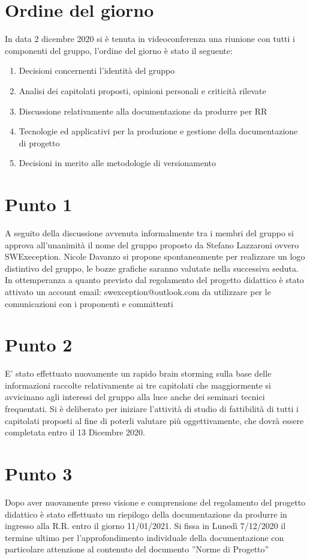 \documentclass[12pt,italian,a4paper]{article}
\begin{document}
	\newpage


	\section*{Ordine del giorno}
	In data 2 dicembre 2020 si è tenuta in videoconferenza una riunione con tutti i componenti del gruppo, l'ordine del giorno è stato il seguente:
	\begin{enumerate}
		\item Decisioni concernenti l'identità del gruppo
		\item Analisi dei capitolati proposti, opinioni personali e criticità rilevate
		\item Discussione relativamente alla documentazione da produrre per RR
		\item Tecnologie ed applicativi per la produzione e gestione della documentazione di progetto
		\item Decisioni in merito alle metodologie di versionamento
	\end{enumerate}

	\section*{Punto 1}
	A seguito della discussione avvenuta informalmente tra i membri del gruppo si approva all’unanimità il nome del gruppo proposto da Stefano Lazzaroni ovvero SWExeception. Nicole Davanzo si propone spontaneamente per realizzare un logo distintivo del gruppo, le bozze grafiche saranno valutate nella successiva seduta.
	In ottemperanza a quanto previsto dal regolamento del progetto didattico è stato attivato un account email: swexception@outlook.com da utilizzare per le comunicazioni con i proponenti e committenti

	\section*{Punto 2}
    E’ stato effettuato nuovamente un rapido brain storming sulla base delle informazioni raccolte relativamente ai tre capitolati che maggiormente si avvicinano agli interessi del gruppo alla luce anche dei seminari tecnici frequentati.
    Si è deliberato per iniziare l’attività di studio di fattibilità di tutti i capitolati proposti al fine di poterli valutare più oggettivamente, che dovrà essere completata entro il 13 Dicembre 2020.

	\section*{Punto 3}
	Dopo aver nuovamente preso visione e comprensione del regolamento del progetto didattico è stato effettuato un riepilogo della documentazione da produrre in ingresso alla R.R. entro il giorno 11/01/2021. Si fissa in Lunedì 7/12/2020 il termine ultimo per l’approfondimento individuale della documentazione con particolare attenzione al contenuto del documento ”Norme di Progetto”
\end{document}
